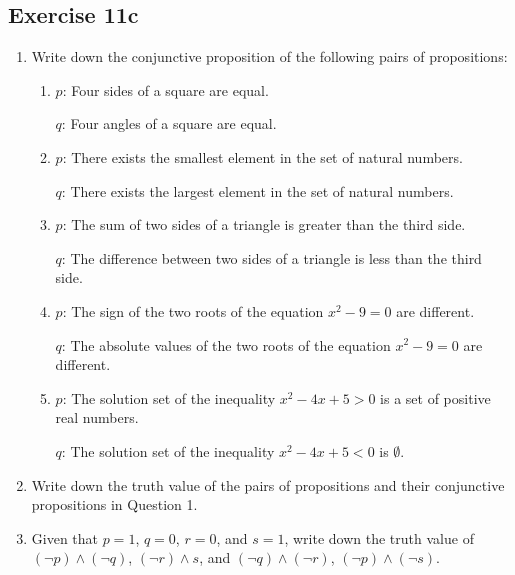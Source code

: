 \documentclass{report}
\begin{document}
\subsection*{Exercise 11c}
\begin{enumerate}[leftmargin=*]
    \item Write down the conjunctive proposition of the following pairs of propositions:
          \begin{enumerate}[label=(\alph*), leftmargin=*]
              \item $p$: Four sides of a square are equal.

                    $q$: Four angles of a square are equal.

              \item $p$: There exists the smallest element in the set of natural numbers.

                    $q$: There exists the largest element in the set of natural numbers.

              \item $p$: The sum of two sides of a triangle is greater than the third side.

                    $q$: The difference between two sides of a triangle is less than the third side.

              \item $p$: The sign of the two roots of the equation $x^2 - 9 = 0$ are different.

                    $q$: The absolute values of the two roots of the equation $x^2 - 9 = 0$ are different.

              \item $p$: The solution set of the inequality $x^2 - 4x + 5 > 0$ is a set of positive real numbers.

                    $q$: The solution set of the inequality $x^2 - 4x + 5 < 0$ is $\emptyset$.
          \end{enumerate}

    \item Write down the truth value of the pairs of propositions and their conjunctive
          propositions in Question 1.

    \item Given that $p = 1$, $q = 0$, $r = 0$, and $s = 1$, write down the truth value
          of $(\neg p) \land (\neg q)$, $(\neg r) \land s$, and $(\neg q) \land (\neg
              r)$, $(\neg p) \land (\neg s)$.
\end{enumerate}
\end{document}
